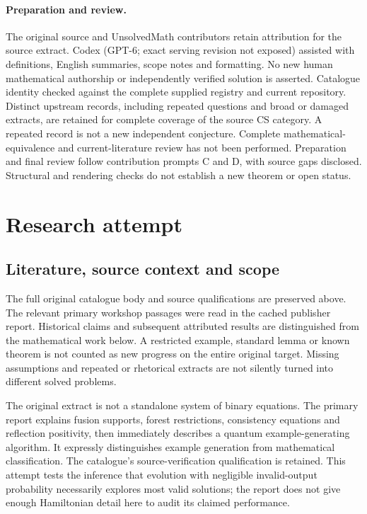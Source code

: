 \documentclass[11pt]{article}
\begin{document}
\paragraph{Preparation and review.}
The original source and UnsolvedMath contributors retain attribution for the source extract. Codex (GPT-6; exact serving revision not exposed) assisted with definitions, English summaries, scope notes and formatting. No new human mathematical authorship or independently verified solution is asserted. Catalogue identity checked against the complete supplied registry and current repository. Distinct upstream records, including repeated questions and broad or damaged extracts, are retained for complete coverage of the source CS category. A repeated record is not a new independent conjecture. Complete mathematical-equivalence and current-literature review has not been performed. Preparation and final review follow contribution prompts C and D, with source gaps disclosed. Structural and rendering checks do not establish a new theorem or open status.
\label{end:statement}

\section{Research attempt}
\subsection{Literature, source context and scope}
The full original catalogue body and source qualifications are preserved above. The relevant primary workshop passages were read in the cached publisher report. Historical claims and subsequent attributed results are distinguished from the mathematical work below. A restricted example, standard lemma or known theorem is not counted as new progress on the entire original target. Missing assumptions and repeated or rhetorical extracts are not silently turned into different solved problems.

The original extract is not a standalone system of binary equations. The primary report explains fusion supports, forest restrictions, consistency equations and reflection positivity, then immediately describes a quantum example-generating algorithm. It expressly distinguishes example generation from mathematical classification. The catalogue's source-verification qualification is retained. This attempt tests the inference that evolution with negligible invalid-output probability necessarily explores most valid solutions; the report does not give enough Hamiltonian detail here to audit its claimed performance.
\end{document}
